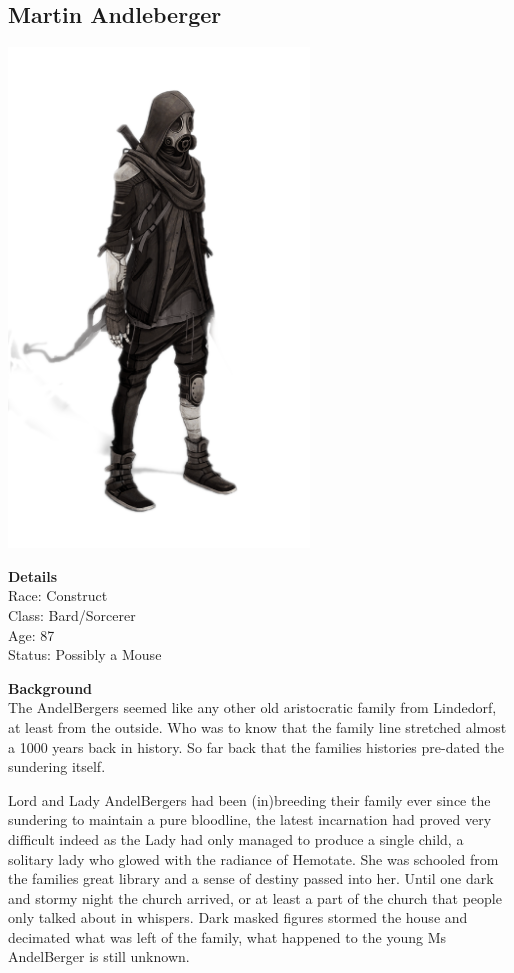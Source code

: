 \subsection{Martin Andleberger}
\begin{center}
\includegraphics[width=80mm]{./content/img/martin.png}
\begin{figure}[h]
\end{figure}
\end{center}

\textbf{Details}\\
Race: Construct\\
Class: Bard/Sorcerer\\
Age: 87\\
Status: Possibly a Mouse\bigskip

\textbf{Background}\\
The AndelBergers seemed like any other old aristocratic family from Lindedorf, at least from the outside. Who was to know that the family line stretched almost a 1000 years back in history. So far back that the families histories pre-dated the sundering itself.    \medskip

Lord and Lady AndelBergers had been (in)breeding their family ever since the sundering to maintain a pure bloodline, the latest incarnation had proved very difficult indeed as the Lady had only managed to produce a single child, a solitary lady who glowed with the radiance of Hemotate. She was schooled from the families great library and a sense of destiny passed into her. Until one dark and stormy night the church arrived, or at least a part of the church that people only talked about in whispers. Dark masked figures stormed the house and decimated what was left of the family, what happened to the young Ms AndelBerger is still unknown.   \medskip

